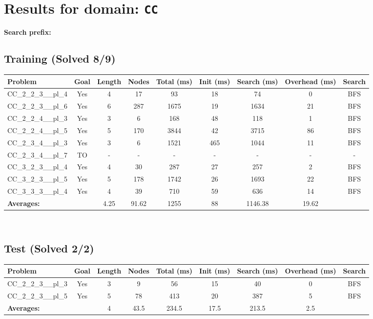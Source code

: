 \documentclass{article}
\begin{document}
\section*{Results for domain: \texttt{CC}}
\textbf{Search prefix:} 
\\[0.5cm]
\subsection*{Training (Solved 8/9)}
\begin{tabular}{lcccccccc}
\toprule
Problem & Goal & Length & Nodes & Total (ms) & Init (ms) & Search (ms) & Overhead (ms) & Search \\
\midrule
CC\_2\_2\_3\_\_pl\_4 & Yes & 4 & 17 & 93 & 18 & 74 & 0 & BFS \\
CC\_2\_2\_3\_\_pl\_6 & Yes & 6 & 287 & 1675 & 19 & 1634 & 21 & BFS \\
CC\_2\_2\_4\_\_pl\_3 & Yes & 3 & 6 & 168 & 48 & 118 & 1 & BFS \\
CC\_2\_2\_4\_\_pl\_5 & Yes & 5 & 170 & 3844 & 42 & 3715 & 86 & BFS \\
CC\_2\_3\_4\_\_pl\_3 & Yes & 3 & 6 & 1521 & 465 & 1044 & 11 & BFS \\
CC\_2\_3\_4\_\_pl\_7 & TO & - & - & - & - & - & - & - \\
CC\_3\_2\_3\_\_pl\_4 & Yes & 4 & 30 & 287 & 27 & 257 & 2 & BFS \\
CC\_3\_2\_3\_\_pl\_5 & Yes & 5 & 178 & 1742 & 26 & 1693 & 22 & BFS \\
CC\_3\_3\_3\_\_pl\_4 & Yes & 4 & 39 & 710 & 59 & 636 & 14 & BFS \\
\textbf{Averages:} & & 4.25 & 91.62 & 1255 & 88 & 1146.38 & 19.62 & \\
\bottomrule
\end{tabular}
\\[0.7cm]
\subsection*{Test (Solved 2/2)}
\begin{tabular}{lcccccccc}
\toprule
Problem & Goal & Length & Nodes & Total (ms) & Init (ms) & Search (ms) & Overhead (ms) & Search \\
\midrule
CC\_2\_2\_3\_\_pl\_3 & Yes & 3 & 9 & 56 & 15 & 40 & 0 & BFS \\
CC\_2\_2\_3\_\_pl\_5 & Yes & 5 & 78 & 413 & 20 & 387 & 5 & BFS \\
\textbf{Averages:} & & 4 & 43.5 & 234.5 & 17.5 & 213.5 & 2.5 & \\
\bottomrule
\end{tabular}
\\[0.7cm]
\end{document}
